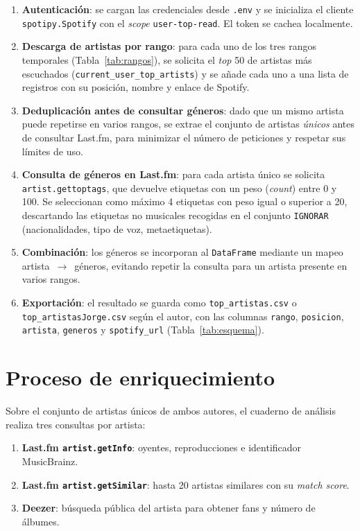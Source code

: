 \begin{enumerate}
    \item \textbf{Autenticación}: se cargan las credenciales desde \texttt{.env} y se inicializa el cliente \texttt{spotipy.Spotify} con el \emph{scope} \texttt{user-top-read}. El token se cachea localmente.
    \item \textbf{Descarga de artistas por rango}: para cada uno de los tres rangos temporales (Tabla~\ref{tab:rangos}), se solicita el \emph{top} 50 de artistas más escuchados (\nolinkurl{current_user_top_artists}) y se añade cada uno a una lista de registros con su posición, nombre y enlace de Spotify.
    \item \textbf{Deduplicación antes de consultar géneros}: dado que un mismo artista puede repetirse en varios rangos, se extrae el conjunto de artistas \emph{únicos} antes de consultar Last.fm, para minimizar el número de peticiones y respetar sus límites de uso.
    \item \textbf{Consulta de géneros en Last.fm}: para cada artista único se solicita \nolinkurl{artist.gettoptags}, que devuelve etiquetas con un peso (\emph{count}) entre 0 y 100. Se seleccionan como máximo 4 etiquetas con peso igual o superior a 20, descartando las etiquetas no musicales recogidas en el conjunto \texttt{IGNORAR} (nacionalidades, tipo de voz, metaetiquetas).
    \item \textbf{Combinación}: los géneros se incorporan al \texttt{DataFrame} mediante un mapeo artista~$\rightarrow$~géneros, evitando repetir la consulta para un artista presente en varios rangos.
    \item \textbf{Exportación}: el resultado se guarda como \texttt{top\_artistas.csv} o \nolinkurl{top_artistasJorge.csv} según el autor, con las columnas \texttt{rango}, \texttt{posicion}, \texttt{artista}, \texttt{generos} y \texttt{spotify\_url} (Tabla~\ref{tab:esquema}).
\end{enumerate}

\section{Proceso de enriquecimiento}
\label{sec:proceso-enriquecimiento}

Sobre el conjunto de artistas únicos de ambos autores, el cuaderno de análisis realiza tres consultas por artista:

\begin{enumerate}
    \item \textbf{Last.fm \texttt{artist.getInfo}}: oyentes, reproducciones e identificador MusicBrainz.
    \item \textbf{Last.fm \texttt{artist.getSimilar}}: hasta 20 artistas similares con su \emph{match score}.
    \item \textbf{Deezer}: búsqueda pública del artista para obtener fans y número de álbumes.
\end{enumerate}


